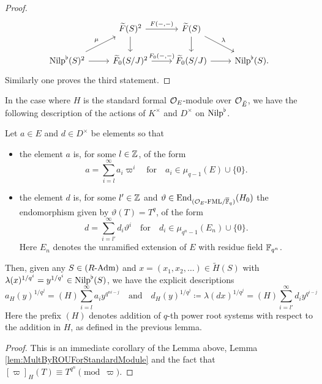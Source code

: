 \documentclass[../main.tex]{subfiles}
\begin{document}
\begin{lem}
\begin{proof}
\begin{equation*}
    \begin{tikzcd}[ampersand replacement=\&]
    	\& {\Tilde F(S)^2} \& {\Tilde F(S)} \\
    	{\Nilp^\flat(S)^2} \& {\Tilde F_0(S/J)^2} \& {\Tilde F_0(S/J)} \& {\Nilp^\flat(S).}
    	\arrow["{F(-,-)}", from=1-2, to=1-3]
    	\arrow[ from=1-2, to=2-2]
    	\arrow[ from=1-3, to=2-3]
    	\arrow["\lambda", from=1-3, to=2-4]
    	\arrow["\mu", from=2-1, to=1-2]
    	\arrow[ from=2-1, to=2-2]
    	\arrow["{F_0(-,-)}", from=2-2, to=2-3]
    	\arrow[from=2-3, to=2-4]
    \end{tikzcd}
  \end{equation*}
  Similarly one proves the third statement.
\end{proof}
\end{lem}


In the case where $H$ is the standard formal $\mathcal{O}_E$-module over $\mathcal{O}_{\breve {E}}$,
we have the following description of the actions of $K^\times$ and $D^\times$ on
${\mathrm{Nilp}}^\flat$.

\begin{cor}\label{cor:ExplicitDescriptionOfActionOnUnivCov}
  Let $a \in E$ and $d \in D^\times$ be elements so that
  \begin{itemize}
    \item the element $a$ is, for some $l \in \mathbb{Z}$, of the form
      \begin{equation*}
        a = \sum_{i = l}^\infty a_i \varpi^i \quad \text{for} \quad
        a_i \in \mu_{q-1}(E) \cup \{0\}.
      \end{equation*}
    \item the element $d$ is, for some $l' \in \mathbb{Z}$ and 
      $\vartheta \in \operatorname{End}_{{({\mathcal{O}_E}\text-\allowbreak\mathrm{FML}/{{\overline {\mathbb{F}}_q}})}} (H_0)$ the endomorphism given
      by $\vartheta(T) = T^q$, of the form
      \begin{equation*}
        d = \sum_{i = l'}^\infty d_i \vartheta^i \quad \text{for} \quad
        d_i \in \mu_{q^n-1}(E_n) \cup \{0\}.
      \end{equation*}
      Here $E_n$ denotes the unramified extension of $E$ with residue field 
      $\mathbb{F}_{q^n}$. 
  \end{itemize}
  Then, given any $S \in {({R}\text-\allowbreak\mathrm{Adm})}$  and $x = (x_1, x_2, \dots)
  \in \tilde H(S)$ with $\lambda(x)^{1/q^i} = y^{1/q^i} \in {\mathrm{Nilp}}^\flat(S)$, we
  have the explicit descriptions
  \begin{equation*}
    a_H(y)^{1/q^j}  = (H) \sum_{i=l}^\infty a_i y^{q^{ni-j}}
  \quad \text{and} \quad
  d_H(y)^{1/q^j} \coloneqq \lambda(dx)^{1/q^j} = (H) \sum_{i=l'}^\infty d_i y^{q^{i-j}}
  \end{equation*}
  Here the prefix $(H)$ denotes addition of $q$-th power root systems with
  respect to the addition in $H$, as defined in the previous lemma.
  \begin{proof}
    This is an immediate corollary of the Lemma above, Lemma
    \ref{lem:MultByROUForStandardModule} and the fact that 
    $[\varpi]_H(T) \equiv T^{q^n} \pmod \varpi$. 
  \end{proof}
\end{cor}
\end{document}
